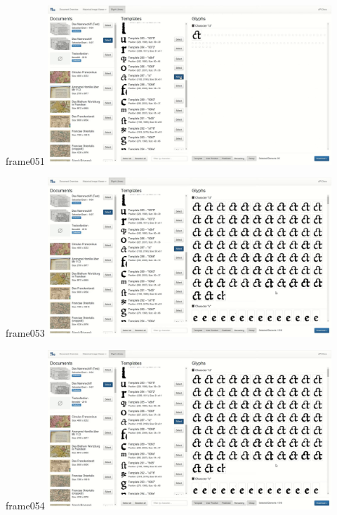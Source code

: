 \documentclass{beamer}
\begin{document}
\begin{frame}{frame051}
\includegraphics[width=0.8\textwidth]{output/exported-frames/frame051.png}
\note{}
\end{frame}

\begin{frame}{frame053}
\includegraphics[width=0.8\textwidth]{output/exported-frames/frame053.png}
\note{}
\end{frame}

\begin{frame}{frame054}
\includegraphics[width=0.8\textwidth]{output/exported-frames/frame054.png}
\note{}
\end{frame}
\end{document}
